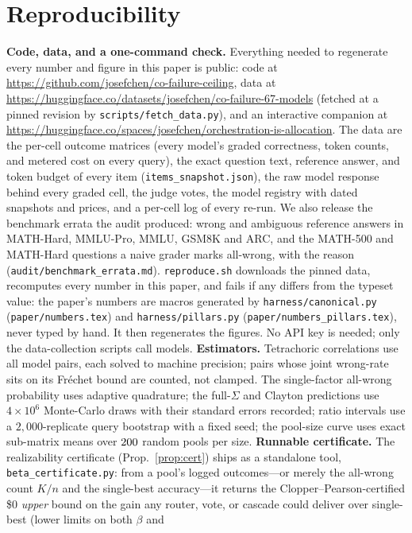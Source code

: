\documentclass[11pt]{article}
\theoremstyle{plain}
\theoremstyle{definition}
\begin{document}
\section{Reproducibility}\label{app:repro}
\textbf{Code, data, and a one-command check.} Everything needed to regenerate every number and figure in this paper is
public: code at \url{https://github.com/josefchen/co-failure-ceiling}, data at
\url{https://huggingface.co/datasets/josefchen/co-failure-67-models} (fetched at a pinned revision by
\texttt{scripts/fetch\_data.py}), and an interactive companion at
\url{https://huggingface.co/spaces/josefchen/orchestration-is-allocation}. The data are the per-cell outcome matrices (every
model's graded correctness, token counts, and metered cost on every query), the exact question text, reference answer, and
token budget of every item (\texttt{items\_snapshot.json}), the raw model response behind every graded cell, the judge votes,
the model registry with dated snapshots and prices, and a per-cell log of every re-run. We also release the benchmark
errata the audit produced: wrong and ambiguous reference answers in MATH-Hard, MMLU-Pro, MMLU, GSM8K and ARC, and the
MATH-500 and MATH-Hard questions a naive grader marks all-wrong, with the reason (\texttt{audit/benchmark\_errata.md}). \texttt{reproduce.sh} downloads the
pinned data, recomputes every number in this paper, and fails if any differs from the typeset value: the paper's numbers are
macros generated by \texttt{harness/canonical.py} (\texttt{paper/numbers.tex}) and \texttt{harness/pillars.py}
(\texttt{paper/numbers\_pillars.tex}), never typed by hand. It then regenerates the figures. No API key is needed; only the
data-collection scripts call models. \textbf{Estimators.} Tetrachoric correlations use all model pairs, each solved to
machine precision; pairs whose joint wrong-rate sits on its Fr\'echet bound are counted, not clamped. The single-factor
all-wrong probability uses adaptive quadrature; the full-$\Sigma$ and Clayton predictions use $4{\times}10^6$ Monte-Carlo draws
with their standard errors recorded; ratio intervals use a $2{,}000$-replicate query bootstrap with a fixed seed; the pool-size
curve uses exact sub-matrix means over $200$ random pools per size. \textbf{Runnable certificate.} The realizability
certificate (Prop.~\ref{prop:cert}) ships as a standalone tool, \texttt{beta\_certificate.py}: from a pool's logged
outcomes---or merely the all-wrong count $K/n$ and the single-best accuracy---it returns the Clopper--Pearson-certified \$0
\emph{upper} bound on the gain any router, vote, or cascade could deliver over single-best (lower limits on both $\beta$ and
\end{document}
